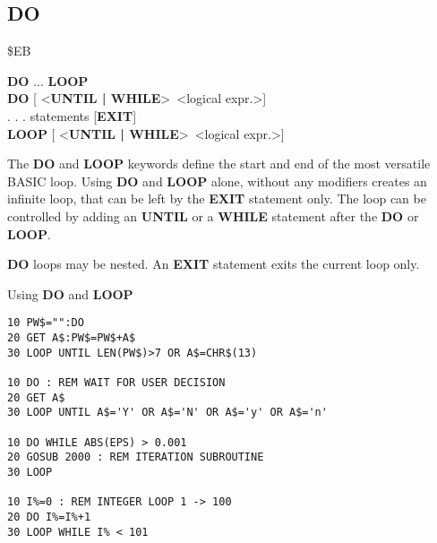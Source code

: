 \subsection{DO}
\begin{description}[leftmargin=2cm,style=nextline]
\item [Token:] \$EB
\item [Format:] {\bf DO} ... {\bf LOOP} \\
                {\bf DO} [ <{\bf UNTIL | WHILE}> <logical expr.>] \\
                . . . statements [{\bf EXIT}] \\
                {\bf LOOP} [ <{\bf UNTIL | WHILE}> <logical expr.>]
\item [Usage:] The {\bf DO} and {\bf LOOP} keywords define
               the start and end of the most versatile BASIC loop.
               Using {\bf DO} and {\bf LOOP} alone, without any
               modifiers creates an infinite loop, that can be left
               by the {\bf EXIT} statement only. The loop can be
               controlled by adding an {\bf UNTIL} or a {\bf WHILE}
               statement after the {\bf DO} or {\bf LOOP}.

\item [Remarks:] {\bf DO} loops may be nested. An {\bf EXIT} statement
               exits the current loop only.
\item [Example:] Using {\bf DO} and {\bf LOOP}
\begin{tcolorbox}[colback=black,coltext=white]
\verbatimfont{\codefont}
\begin{verbatim}
10 PW$="":DO
20 GET A$:PW$=PW$+A$
30 LOOP UNTIL LEN(PW$)>7 OR A$=CHR$(13)

10 DO : REM WAIT FOR USER DECISION
20 GET A$
30 LOOP UNTIL A$='Y' OR A$='N' OR A$='y' OR A$='n'

10 DO WHILE ABS(EPS) > 0.001
20 GOSUB 2000 : REM ITERATION SUBROUTINE
30 LOOP

10 I%
20 DO I%
30 LOOP WHILE I%
\end{verbatim}
\end{tcolorbox}
\end{description}


\newpage
